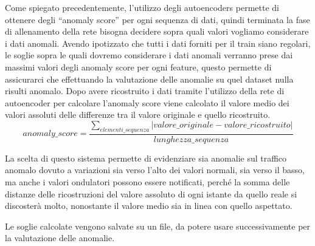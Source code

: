 Come spiegato precedentemente, l'utilizzo degli autoencoders permette di ottenere degli ``anomaly score'' per ogni sequenza di dati, quindi terminata la fase di allenamento della rete bisogna decidere sopra quali valori vogliamo considerare i dati anomali.
Avendo ipotizzato che tutti i dati forniti per il train siano regolari, le soglie sopra le quali dovremo considerare i dati anomali verranno prese dai massimi valori degli anomaly score per ogni feature, questo permette di assicurarci che effettuando la valutazione delle anomalie su quel dataset nulla risulti anomalo.
Dopo avere ricostruito i dati tramite l’utilizzo della rete di autoencoder per calcolare l'anomaly score viene calcolato il valore medio dei valori assoluti delle differenze tra il valore originale e quello ricostruito.
\begin{equation}
    anomaly\_score = \frac{\sum_{elementi\_sequenza}\lvert valore\_originale - valore\_ricostruito \rvert}{lunghezza\_sequenza}
\end{equation}

La scelta di questo sistema permette di evidenziare sia anomalie sul traffico anomalo dovuto a variazioni sia verso l'alto dei valori normali, sia verso il basso, ma anche i valori ondulatori possono essere notificati, perché la somma delle distanze delle ricostruzioni del valore assoluto di ogni istante da quello reale si discosterà molto, nonostante il valore medio sia in linea con quello aspettato.

Le soglie calcolate vengono salvate su un file, da potere usare successivamente per la valutazione delle anomalie.








